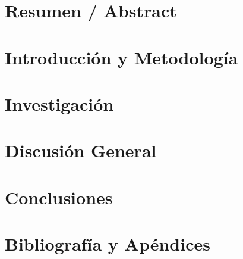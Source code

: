 \documentclass[%
    paper=A4,               %
    twoside=true,           %
    openright,              %
    parskip=half,           %
    chapterprefix=true,     %
    12pt,                   %
    headings=normal,        %
    bibliography=totoc,     %
    listof=totoc,           %
    titlepage=on,           %
    captions=tableabove,    %
    chapterprefix=false,    %
    appendixprefix=false,    %
    draft=false,            %
]{scrreprt}%
\begin{document}
\renewcommand{\partname}{Parte}
\part*{Resumen / Abstract}
 


\renewcommand{\partname}{Parte}
\part{Introducción y Metodología}
   
  

\renewcommand{\partname}{Parte}
\part{Investigación}
   
  
 
 
   
 

\renewcommand{\partname}{Parte}
\part{Discusión General}
       
\renewcommand{\partname}{Parte}
\part{Conclusiones}


\renewcommand{\partname}{Parte}
\part{Bibliografía y Apéndices}

{%
\renewcommand{\bibfont}{\scriptsize}
\setlength{\biblabelsep}{0pt}
\setlength{\bibhang}{.25\bibhang}
\setlength{\bibitemsep}{0.1\baselineskip plus 0.1\baselineskip}
\printbibliography[title={Bibliografía}]
}%
\cleardoublepage
\end{document}
